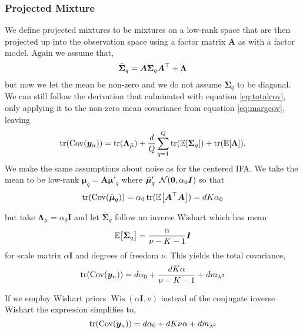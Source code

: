 \documentclass{article}
\newcommand{\mix}{\bm{A}}
\newcommand{\obs}{y}
\newcommand{\obsvec}{\bm{\obs}}
\newcommand{\mean}{\mu}
\newcommand{\meanvec}{\bm{\mean}}
\newcommand{\sourcecov}{\bm{\Sigma}}
\newcommand{\compmean}{\bar{\mean}}
\newcommand{\compmeanvec}{\bar{\meanvec}}
\newcommand{\compcov}{\bar{\bm{\Sigma}}}
\newcommand{\noisecov}{\bm{\Lambda}}
\newcommand{\noisescalesq}{\lambda^2}
\begin{document}
\subsubsection{Projected Mixture}
We define projected mixtures to be mixtures on a low-rank space that are then projected up into the observation space using a factor matrix $\mix$ as with a factor model. Again we assume that,
\begin{equation}
\compcov_q=\mix \sourcecov_q\mix\T+\noisecov
\end{equation} 
but now we let the mean be non-zero and we do not assume $\sourcecov_q$ to be diagonal. We can still follow the derivation that culminated with equation \ref{eq:totalcov}, only applying it to the non-zero mean covariance from equation \ref{eq:margcov}, leaving
\begin{equation}
\trace(\Cov{\obsvec_n})=\trace(\noisecov_{\compmean})+\frac{d}{Q}\sum_{q=1}^{Q}\trace(\E{\sourcecov_q})+\trace(\E{\noisecov}).
\end{equation}
We make the same assumptions about noise as for the centered IFA. We take the mean to be low-rank $\compmeanvec_q=\mix {\compmeanvec}'_q$ where $\compmeanvec'_q~\gaussrnd(\bm{0},\alpha_0\bm{I})$ so that
\begin{equation}
\trace(\Cov{\compmeanvec_q})=\alpha_0\trace(\E{\mix\T\mix})=dK\alpha_0 
\end{equation}

 but take $\noisecov_{\compmean}=\alpha_0\bm{I}$ and let $\compcov_q$ follow an inverse Wishart which has mean 
\begin{equation}
\E{\compcov_q}=\frac{\alpha}{\nu - K - 1}\bm{I}
\end{equation}
for scale matrix $\alpha \bm{I}$ and degrees of freedom $\nu$. This yields the total covariance,
\begin{equation}
\trace(\Cov{\obsvec_n})=d\alpha_0+\frac{dK\alpha}{\nu-K-1}+dm_{\noisescalesq}
\end{equation}  

If we employ Wishart priors $\operatorname{Wis}(\alpha\bm{I},\nu)$ instead of the conjugate inverse Wishart the expression simplifies to,
\begin{equation}
\trace(\Cov{\obsvec_n})=d\alpha_0+dK\nu\alpha+dm_{\noisescalesq}
\end{equation}  
\end{document}
